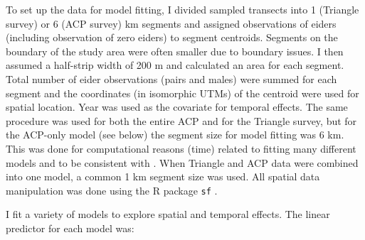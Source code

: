 \documentclass[
  10pt,
  letterpaper,
]{article}
\begin{document}
To set up the data for model fitting, I divided sampled transects into 1
(Triangle survey) or 6 (ACP survey) km segments and assigned
observations of eiders (including observation of zero eiders) to segment
centroids. Segments on the boundary of the study area were often smaller
due to boundary issues. I then assumed a half-strip width of 200 m and
calculated an area for each segment. Total number of eider observations
(pairs and males) were summed for each segment and the coordinates (in
isomorphic UTMs) of the centroid were used for spatial location. Year
was used as the covariate for temporal effects. The same procedure was
used for both the entire ACP and for the Triangle survey, but for the
ACP-only model (see below) the segment size for model fitting was 6 km.
This was done for computational reasons (time) related to fitting many
different models and to be consistent with \citep{amundson2019}. When
Triangle and ACP data were combined into one model, a common 1 km
segment size was used. All spatial data manipulation was done using the
R package \texttt{sf} \citep{sf}.

I fit a variety of models to explore spatial and temporal effects. The
linear predictor for each model was:
\end{document}
